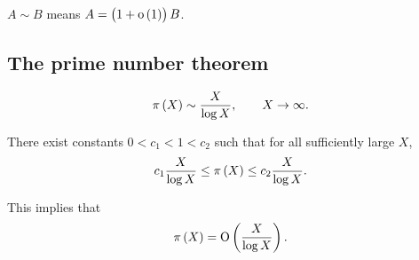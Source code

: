 $ A \sim B $ means $ A = \br{1 + \o\br{1}}B $.

\subsection{The prime number theorem}

\begin{theorem}
$$ \pi\br{X} \sim \dfrac{X}{\log X}, \qquad X \to \infty. $$
\end{theorem}

\begin{theorem}
There exist constants $ 0 < c_1 < 1 < c_2 $ such that for all sufficiently large $ X $,
$$ c_1\dfrac{X}{\log X} \le \pi\br{X} \le c_2\dfrac{X}{\log X}. $$
\end{theorem}

This implies that
$$ \pi\br{X} = \O\br{\dfrac{X}{\log X}}. $$


